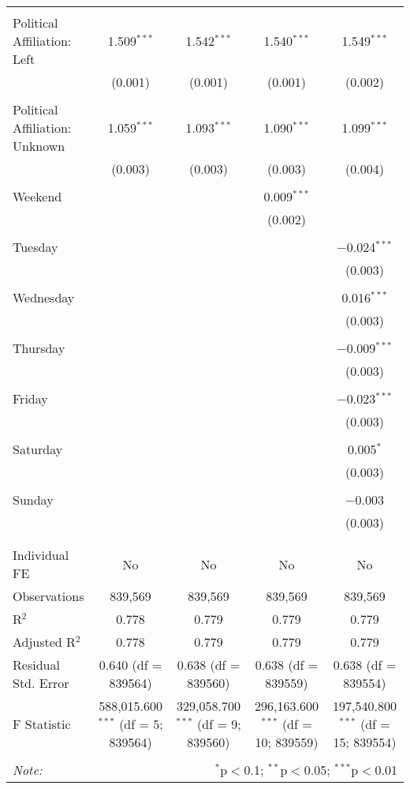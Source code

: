 \documentclass[
]{article}
\begin{document}
\begin{table}[!htbp]
{\begin{tabular}{@{\extracolsep{5pt}}lcccc}
  & & & & \\ 
 Political Affiliation: Left & 1.509$^{***}$ & 1.542$^{***}$ & 1.540$^{***}$ & 1.549$^{***}$ \\ 
  & (0.001) & (0.001) & (0.001) & (0.002) \\ 
  & & & & \\ 
 Political Affiliation: Unknown & 1.059$^{***}$ & 1.093$^{***}$ & 1.090$^{***}$ & 1.099$^{***}$ \\ 
  & (0.003) & (0.003) & (0.003) & (0.004) \\ 
  & & & & \\ 
 Weekend &  &  & 0.009$^{***}$ &  \\ 
  &  &  & (0.002) &  \\ 
  & & & & \\ 
 Tuesday &  &  &  & $-$0.024$^{***}$ \\ 
  &  &  &  & (0.003) \\ 
  & & & & \\ 
 Wednesday &  &  &  & 0.016$^{***}$ \\ 
  &  &  &  & (0.003) \\ 
  & & & & \\ 
 Thursday &  &  &  & $-$0.009$^{***}$ \\ 
  &  &  &  & (0.003) \\ 
  & & & & \\ 
 Friday &  &  &  & $-$0.023$^{***}$ \\ 
  &  &  &  & (0.003) \\ 
  & & & & \\ 
 Saturday &  &  &  & 0.005$^{*}$ \\ 
  &  &  &  & (0.003) \\ 
  & & & & \\ 
 Sunday &  &  &  & $-$0.003 \\ 
  &  &  &  & (0.003) \\ 
  & & & & \\ 
\hline \\[-1.8ex] 
Individual FE & No & No & No & No \\ 
Observations & 839,569 & 839,569 & 839,569 & 839,569 \\ 
R$^{2}$ & 0.778 & 0.779 & 0.779 & 0.779 \\ 
Adjusted R$^{2}$ & 0.778 & 0.779 & 0.779 & 0.779 \\ 
Residual Std. Error & 0.640 (df = 839564) & 0.638 (df = 839560) & 0.638 (df = 839559) & 0.638 (df = 839554) \\ 
F Statistic & 588,015.600$^{***}$ (df = 5; 839564) & 329,058.700$^{***}$ (df = 9; 839560) & 296,163.600$^{***}$ (df = 10; 839559) & 197,540.800$^{***}$ (df = 15; 839554) \\ 
\hline 
\hline \\[-1.8ex] 
\textit{Note:}  & \multicolumn{4}{r}{$^{*}$p$<$0.1; $^{**}$p$<$0.05; $^{***}$p$<$0.01} \\ 
\end{tabular}
} 
\end{table} 
\newpage
\end{document}
